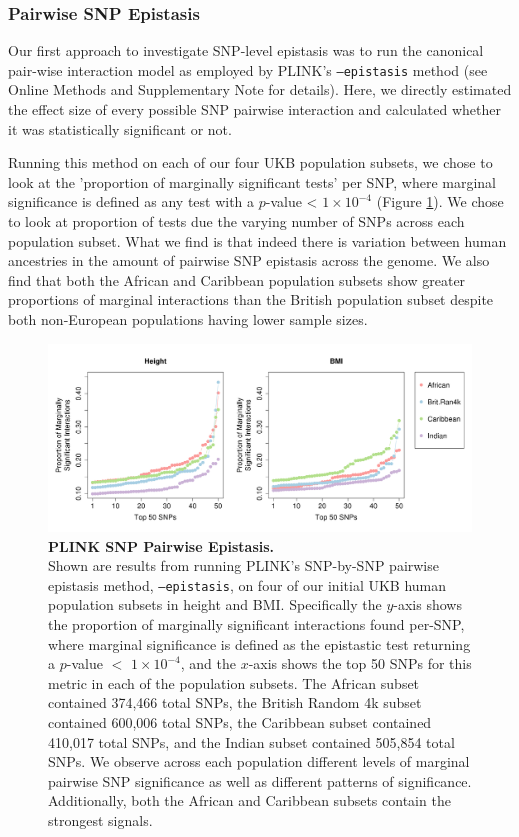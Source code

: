 \documentclass[12pt, a4paper]{article}
\begin{document}
\subsubsection{Pairwise SNP Epistasis}

Our first approach to investigate SNP-level epistasis was to run the canonical pair-wise interaction model as employed by PLINK's \texttt{--epistasis} method \citep{Purcell2007} (see Online Methods and Supplementary Note for details). Here, we directly estimated the effect size of every possible SNP pairwise interaction and calculated whether it was statistically significant or not.  

Running this method on each of our four UKB population subsets, we chose to look at the 'proportion of marginally significant tests' per SNP, where marginal significance is defined as any test with a $p$-value < $1\times10^{-4}$ (Figure \ref{InterPath-Supp-Figure-PLINK}). We chose to look at proportion of tests due the varying number of SNPs across each population subset. What we find is that indeed there is variation between human ancestries in the amount of pairwise SNP epistasis across the genome. We also find that both the African and Caribbean population subsets show greater proportions of marginal interactions than the British population subset despite both non-European populations having lower sample sizes. 

\begin{figure}[t]
\centering
\includegraphics[scale=.35]{Images/Supp/InterPath_Supp_Figure_PLINK_vs2.png}
\caption[PLINK SNP Pairwise Epistasis]{\textbf{PLINK SNP Pairwise Epistasis.} \\ Shown are results from running PLINK's SNP-by-SNP pairwise epistasis method, \texttt{--epistasis}, on four of our initial UKB human population subsets in height and BMI. Specifically the $y$-axis shows the proportion of marginally significant interactions found per-SNP, where marginal significance is defined as the epistastic test returning a $p$-value $<$ $1\times10^{-4}$, and the $x$-axis shows the top 50 SNPs for this metric in each of the population subsets. The African subset contained 374,466 total SNPs, the British Random 4k subset contained 600,006 total SNPs, the Caribbean subset contained 410,017 total SNPs, and the Indian subset contained 505,854 total SNPs. We observe across each population different levels of marginal pairwise SNP significance as well as different patterns of significance. Additionally, both the African and Caribbean subsets contain the strongest signals.}
\label{InterPath-Supp-Figure-PLINK}
\end{figure}
\end{document}
